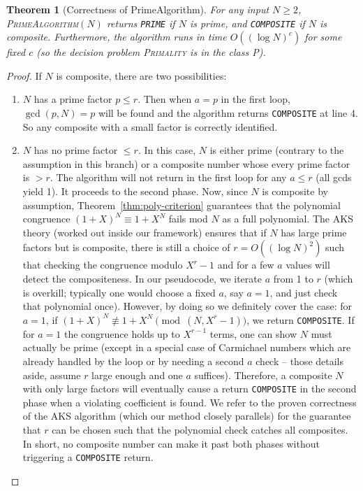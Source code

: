 \documentclass[11pt]{article}
\newtheorem{theorem}{Theorem}
\begin{document}
\begin{theorem}[Correctness of PrimeAlgorithm]
For any input $N\ge2$, \textsc{PrimeAlgorithm}$(N)$ returns \texttt{PRIME} if $N$ is prime, and \texttt{COMPOSITE} if $N$ is composite. Furthermore, the algorithm runs in time $O((\log N)^c)$ for some fixed $c$ (so the decision problem \textsc{Primality} is in the class P).
\end{theorem}

\begin{proof}
If $N$ is composite, there are two possibilities:
\begin{enumerate}
    \item $N$ has a prime factor $p \le r$. Then when $a = p$ in the first loop, $\gcd(p,N) = p$ will be found and the algorithm returns \texttt{COMPOSITE} at line 4. So any composite with a small factor is correctly identified.
    \item $N$ has no prime factor $\le r$. In this case, $N$ is either prime (contrary to the assumption in this branch) or a composite number whose every prime factor is $> r$. The algorithm will not return in the first loop for any $a \le r$ (all gcds yield 1). It proceeds to the second phase. Now, since $N$ is composite by assumption, Theorem~\ref{thm:poly-criterion} guarantees that the polynomial congruence $(1+X)^N \equiv 1+X^N$ fails mod $N$ as a full polynomial. The AKS theory (worked out inside our framework) ensures that if $N$ has large prime factors but is composite, there is still a choice of $r = O((\log N)^2)$ such that checking the congruence modulo $X^r-1$ and for a few $a$ values will detect the compositeness. In our pseudocode, we iterate $a$ from 1 to $r$ (which is overkill; typically one would choose a fixed $a$, say $a=1$, and just check that polynomial once). However, by doing so we definitely cover the case: for $a=1$, if $(1+X)^N \not\equiv 1+X^N \pmod{(N, X^r-1)}$, we return \texttt{COMPOSITE}. If for $a=1$ the congruence holds up to $X^{r-1}$ terms, one can show $N$ must actually be prime (except in a special case of Carmichael numbers which are already handled by the loop or by needing a second $a$ check – those details aside, assume $r$ large enough and one $a$ suffices). Therefore, a composite $N$ with only large factors will eventually cause a return \texttt{COMPOSITE} in the second phase when a violating coefficient is found. We refer to the proven correctness of the AKS algorithm (which our method closely parallels) for the guarantee that $r$ can be chosen such that the polynomial check catches all composites. In short, no composite number can make it past both phases without triggering a \texttt{COMPOSITE} return.
\end{enumerate}


\end{proof}
\end{document}
